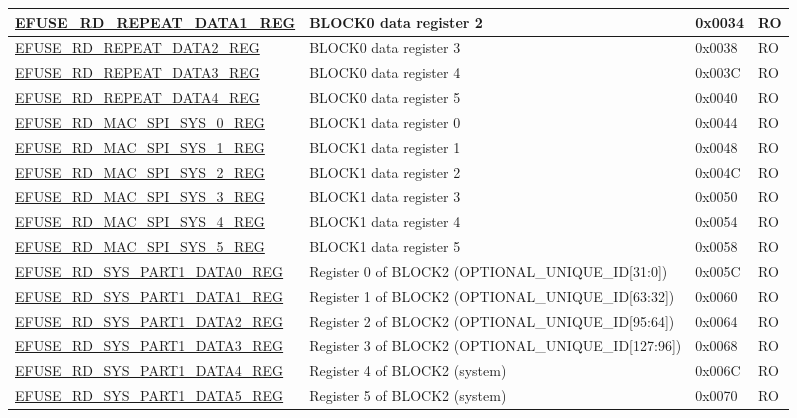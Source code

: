 \begin{longtable}{ | p{6cm} | p{7.2cm} | p{1.3cm} | p{1cm} | }
\hyperref[regdesc:EFUSERDREPEATDATA1REG]{EFUSE\_RD\_REPEAT\_DATA1\_REG} & BLOCK0 data register 2 & 0x0034 & RO \\ \hline
\hyperref[regdesc:EFUSERDREPEATDATA2REG]{EFUSE\_RD\_REPEAT\_DATA2\_REG} & BLOCK0 data register 3 & 0x0038 & RO \\ \hline
\hyperref[regdesc:EFUSERDREPEATDATA3REG]{EFUSE\_RD\_REPEAT\_DATA3\_REG} & BLOCK0 data register 4 & 0x003C & RO \\ \hline
\hyperref[regdesc:EFUSERDREPEATDATA4REG]{EFUSE\_RD\_REPEAT\_DATA4\_REG} & BLOCK0 data register 5 & 0x0040 & RO \\ \hline
\hyperref[regdesc:EFUSERDMACSPISYS0REG]{EFUSE\_RD\_MAC\_SPI\_SYS\_0\_REG} & BLOCK1 data register 0 & 0x0044 & RO \\ \hline
\hyperref[regdesc:EFUSERDMACSPISYS1REG]{EFUSE\_RD\_MAC\_SPI\_SYS\_1\_REG} & BLOCK1 data register 1 & 0x0048 & RO \\ \hline
\hyperref[regdesc:EFUSERDMACSPISYS2REG]{EFUSE\_RD\_MAC\_SPI\_SYS\_2\_REG} & BLOCK1 data register 2 & 0x004C & RO \\ \hline
\hyperref[regdesc:EFUSERDMACSPISYS3REG]{EFUSE\_RD\_MAC\_SPI\_SYS\_3\_REG} & BLOCK1 data register 3 & 0x0050 & RO \\ \hline
\hyperref[regdesc:EFUSERDMACSPISYS4REG]{EFUSE\_RD\_MAC\_SPI\_SYS\_4\_REG} & BLOCK1 data register 4 & 0x0054 & RO \\ \hline
\hyperref[regdesc:EFUSERDMACSPISYS5REG]{EFUSE\_RD\_MAC\_SPI\_SYS\_5\_REG} & BLOCK1 data register 5 & 0x0058 & RO \\ \hline
\hyperref[regdesc:EFUSERDSYSPART1DATA0REG]{EFUSE\_RD\_SYS\_PART1\_DATA0\_REG} & Register 0 of BLOCK2 (OPTIONAL\_UNIQUE\_ID[31:0]) & 0x005C & RO \\ \hline
\hyperref[regdesc:EFUSERDSYSPART1DATA1REG]{EFUSE\_RD\_SYS\_PART1\_DATA1\_REG} & Register 1 of BLOCK2 (OPTIONAL\_UNIQUE\_ID[63:32]) & 0x0060 & RO \\ \hline
\hyperref[regdesc:EFUSERDSYSPART1DATA2REG]{EFUSE\_RD\_SYS\_PART1\_DATA2\_REG} & Register 2 of BLOCK2 (OPTIONAL\_UNIQUE\_ID[95:64]) & 0x0064 & RO \\ \hline
\hyperref[regdesc:EFUSERDSYSPART1DATA3REG]{EFUSE\_RD\_SYS\_PART1\_DATA3\_REG} & Register 3 of BLOCK2 (OPTIONAL\_UNIQUE\_ID[127:96]) & 0x0068 & RO \\ \hline
\hyperref[regdesc:EFUSERDSYSPART1DATA4REG]{EFUSE\_RD\_SYS\_PART1\_DATA4\_REG} & Register 4 of BLOCK2 (system) & 0x006C & RO \\ \hline
\hyperref[regdesc:EFUSERDSYSPART1DATA5REG]{EFUSE\_RD\_SYS\_PART1\_DATA5\_REG} & Register 5 of BLOCK2 (system) & 0x0070 & RO \\ \hline

\end{longtable}
